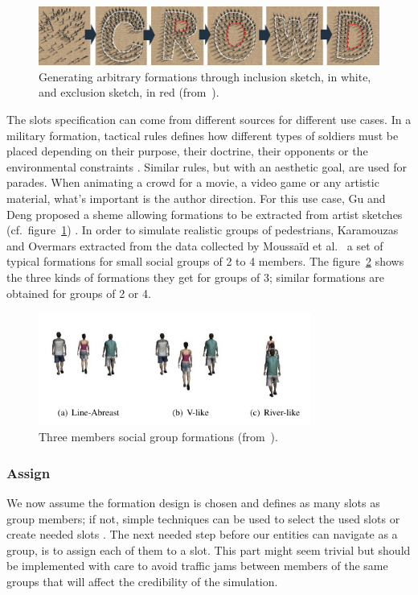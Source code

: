 \documentclass[a4paper,titlepage]{article}
\begin{document}
\begin{figure}[h]
\centering
\includegraphics[width=1.0\textwidth]{SketchedFormations.jpg}
\caption{Generating arbitrary formations through inclusion sketch, in white, and exclusion sketch, in red (from~\cite{Gu:2011wp}).}
\label{fig:sketched_formations}
\end{figure} 

The slots specification can come from different sources for different use cases. In a military formation, tactical rules defines how different types of soldiers must be placed depending on their purpose, their doctrine, their opponents or the environmental constraints \cite{Dawson:2002vd}. Similar rules, but with an aesthetic goal, are used for parades. When animating a crowd for a movie, a video game or any artistic material, what's important is the author direction. For this use case, Gu and Deng proposed a sheme allowing formations to be extracted from artist sketches (cf.\ figure~\ref{fig:sketched_formations}) \cite{Gu:2011wp}. In order to simulate realistic groups of pedestrians, Karamouzas and Overmars \cite{Karamouzas:2010fi} extracted from the data collected by Moussaïd et al.\ \cite{Moussaid:2010ib} a set of typical formations for small social groups of 2 to 4 members. The figure~\ref{fig:social_group_formations} shows the three kinds of formations they get for groups of 3; similar formations are obtained for groups of 2 or 4. 

\begin{figure}[h]
\centering
\includegraphics[width=0.8\textwidth]{SocialGroupFormations.jpg}
\caption{Three members social group formations (from~\cite{Karamouzas:2010fi}).}
\label{fig:social_group_formations}
\end{figure} 

\subsubsection{Assign}
We now assume the formation design is chosen and defines as many slots as group members; if not, simple techniques can be used to select the used slots or create needed slots \cite{Silveira:2008bc}. The next needed step before our entities can navigate as a group, is to assign each of them to a slot. This part might seem trivial but should be implemented with care to avoid traffic jams between members of the same groups that will affect the credibility of the simulation.
\end{document}

